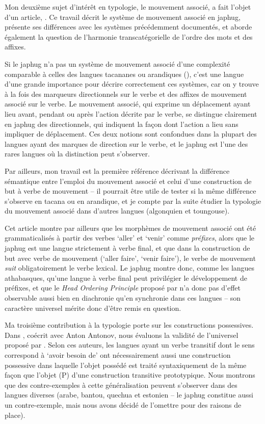 \documentclass[oldfontcommands,oneside,a4paper,11pt]{article}
\begin{document}
Mon deuxième sujet d'intérêt en typologie, le mouvement associé, a fait l'objet d'un article,  \citet{jacques13harmonization}. Ce travail décrit le système  de mouvement associé en japhug, présente ses différences avec les systèmes précédemment documentés, et aborde également la question de l'harmonie transcatégorielle de l'ordre des mots et des affixes. 

Si  le japhug n'a pas un système de mouvement associé d'une complexité comparable à celles des langues tacananes ou arandiques (\citealt{guillaume09mouv.assoc}), c'est une langue d'une grande importance pour décrire correctement ces systèmes, car on y trouve à la fois des marqueurs directionnels sur le verbe et des affixes de mouvement associé sur le verbe. Le mouvement associé, qui exprime  un déplacement ayant lieu avant, pendant ou après l'action décrite par le verbe, se distingue clairement en japhug  des directionnels, qui indiquent la façon dont l'action a lieu sans impliquer de déplacement. Ces deux notions sont confondues dans la plupart des langues ayant des marques de direction sur le verbe, et le japhug est l'une des rares langues où la distinction peut s'observer.

 Par ailleurs, mon travail est la première référence décrivant la différence sémantique entre l'emploi du mouvement associé et celui d'une construction de but à verbe de mouvement -- il pourrait être utile de tester si la même différence s'observe en tacana ou en arandique, et je compte par la suite étudier la typologie du mouvement associé dans d'autres langues (algonquien et toungouse).

Cet article montre par ailleurs que les morphèmes de mouvement associé ont été grammaticalisés à partir des verbes `aller' et `venir' comme \textit{préfixes}, alors que le japhug est une langue strictement à verbe final, et que dans la construction de but avec verbe de mouvement (`aller faire',  `venir faire'), le verbe de mouvement \textit{suit} obligatoirement le verbe lexical. Le japhug montre donc, comme les langues athabasques, qu'une langue à verbe final peut privilégier le développement de préfixes, et que le \textit{Head Ordering Principle} proposé par \citet{hawkins88prefixing} n'a donc pas d'effet observable aussi bien en diachronie qu'en synchronie dans ces langues -- son caractère universel mérite donc d'être remis en question. 

Ma troisième contribution à la typologie porte sur les constructions possessives. Dans \citet{antonov14need}, coécrit avec Anton Antonov, nous évaluons la validité de l'universel proposé par \citet{harves12need}. Selon ces auteurs, les langues ayant un verbe transitif dont le sens correspond à `avoir besoin de' ont nécessairement aussi une construction possessive dans laquelle l'objet possédé est traité syntaxiquement de la même façon que l'objet (P) d'une construction transitive prototypique. Nous montrons que des contre-exemples à cette généralisation peuvent s'observer dans des langues diverses (arabe, bantou, quechua et estonien -- le japhug constitue aussi un contre-exemple, mais nous avons décidé de l'omettre pour des raisons de place). 
 
\end{document}
